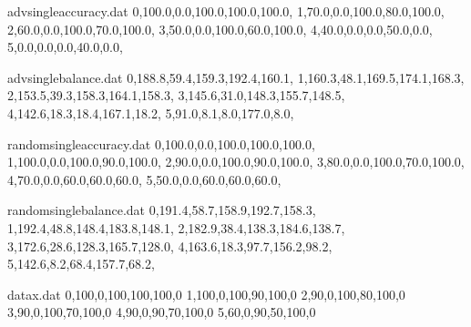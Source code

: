\documentclass{aamas2014}
\begin{document}
\begin{filecontents}{advsingleaccuracy.dat}
0,100.0,0.0,100.0,100.0,100.0,
1,70.0,0.0,100.0,80.0,100.0,
2,60.0,0.0,100.0,70.0,100.0,
3,50.0,0.0,100.0,60.0,100.0,
4,40.0,0.0,0.0,50.0,0.0,
5,0.0,0.0,0.0,40.0,0.0,
\end{filecontents}
\begin{filecontents}{advsinglebalance.dat}
0,188.8,59.4,159.3,192.4,160.1,
1,160.3,48.1,169.5,174.1,168.3,
2,153.5,39.3,158.3,164.1,158.3,
3,145.6,31.0,148.3,155.7,148.5,
4,142.6,18.3,18.4,167.1,18.2,
5,91.0,8.1,8.0,177.0,8.0,
\end{filecontents}
\begin{filecontents}{randomsingleaccuracy.dat}
0,100.0,0.0,100.0,100.0,100.0,
1,100.0,0.0,100.0,90.0,100.0,
2,90.0,0.0,100.0,90.0,100.0,
3,80.0,0.0,100.0,70.0,100.0,
4,70.0,0.0,60.0,60.0,60.0,
5,50.0,0.0,60.0,60.0,60.0,
\end{filecontents}
\begin{filecontents}{randomsinglebalance.dat}
0,191.4,58.7,158.9,192.7,158.3,
1,192.4,48.8,148.4,183.8,148.1,
2,182.9,38.4,138.3,184.6,138.7,
3,172.6,28.6,128.3,165.7,128.0,
4,163.6,18.3,97.7,156.2,98.2,
5,142.6,8.2,68.4,157.7,68.2,
\end{filecontents}
\begin{filecontents}{datax.dat}
0,100,0,100,100,100,0
1,100,0,100,90,100,0
2,90,0,100,80,100,0
3,90,0,100,70,100,0
4,90,0,90,70,100,0
5,60,0,90,50,100,0
\end{filecontents}
\end{document}

